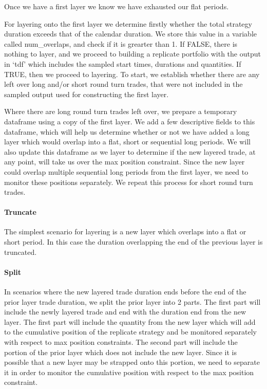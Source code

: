 Once we have a first layer we know we have exhausted our flat periods.

For layering onto the first layer we determine firstly whether the total
strategy duration exceeds that of the calendar duration. We store this
value in a variable called num\_overlaps, and check if it is grearter
than 1. If FALSE, there is nothing to layer, and we proceed to building
a replicate portfolio with the output in `tdf' which includes the
sampled start times, durations and quantities. If TRUE, then we proceed
to layering. To start, we establish whether there are any left over long
and/or short round turn trades, that were not included in the sampled
output used for constructing the first layer.

Where there are long round turn trades left over, we prepare a temporary
dataframe using a copy of the first layer. We add a few descriptive
fields to this dataframe, which will help us determine whether or not we
have added a long layer which would overlap into a flat, short or
sequential long periods. We will also update this dataframe as we layer
to determine if the new layered trade, at any point, will take us over
the max position constraint. Since the new layer could overlap multiple
sequential long periods from the first layer, we need to monitor these
positions separately. We repeat this process for short round turn
trades.

\hypertarget{truncate}{%
\paragraph{Truncate}\label{truncate}}

The simplest scenario for layering is a new layer which overlaps into a
flat or short period. In this case the duration overlapping the end of
the previous layer is truncated.

\hypertarget{split}{%
\paragraph{Split}\label{split}}

In scenarios where the new layered trade duration ends before the end of
the prior layer trade duration, we split the prior layer into 2 parts.
The first part will include the newly layered trade and end with the
duration end from the new layer. The first part will include the
quantity from the new layer which will add to the cumulative position of
the replicate strategy and be monitored separately with respect to max
position constraints. The second part will include the portion of the
prior layer which does not include the new layer. Since it is possible
that a new layer may be strapped onto this portion, we need to separate
it in order to monitor the cumulative position with respect to the max
position constraint.

